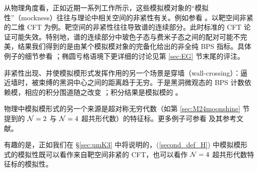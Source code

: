 
从物理角度看，正如近期一系列工作所示，这些模拟模对象的“模拟性”（mockness）往往与理论中相关空间的非紧性有关。例如参看 \cite{VafaWitten1994,Troost:2010ud,Dabholkar:2012nd,Alexandrov:2012au,UMk3}。以靶空间非紧的二维 CFT 为例。靶空间的非紧性往往导致谱的连续部分。此时标准的 CFT 论证可能失效。特别地，谱的连续部分中玻色子态与费米子态之间的配对可能不完美，结果我们得到的是由某个模拟模对象的完备化给出的非全纯 BPS 指标。具体例子的细节参看 \cite{Troost:2010ud,Eguchi:2010cb,Eguchi:2004yi, Ashok:2013pya,Ashok:2011cy,Murthy:2013mya}；椭圆亏格语境下更详细的讨论见第 \ref{sec:EG} 节末尾的评注。


非紧性出现、并使模拟模形式发挥作用的另一个场景是穿墙（wall-crossing）：逼近墙时，被束缚的黑洞中心之间的距离趋于无穷。于是黑洞微观态的 BPS 计数依赖模，相应的积分围道随之改变 \cite{Cheng2007a}；积分结果是模拟模的 \cite{Dabholkar:2012nd}。


物理中模拟模形式的另一个来源是超对称无穷代数（如第 \ref{sec:M24moonshine} 节提到的 ${\cal N}=2$ 与 ${\cal N}=4$ 超共形代数）的特征标。更多例子可参看 \cite{Kac:2014rra} 及其参考文献。


有趣的是，正如我们在 \S\ref{sec:umK3} 中将说明的，(\ref{second_def_H}) 中模拟模形式的模拟性既可以看作来自靶空间非紧的 CFT，也可以看作 ${\cal N}=4$ 超共形代数特征标的模拟性。

